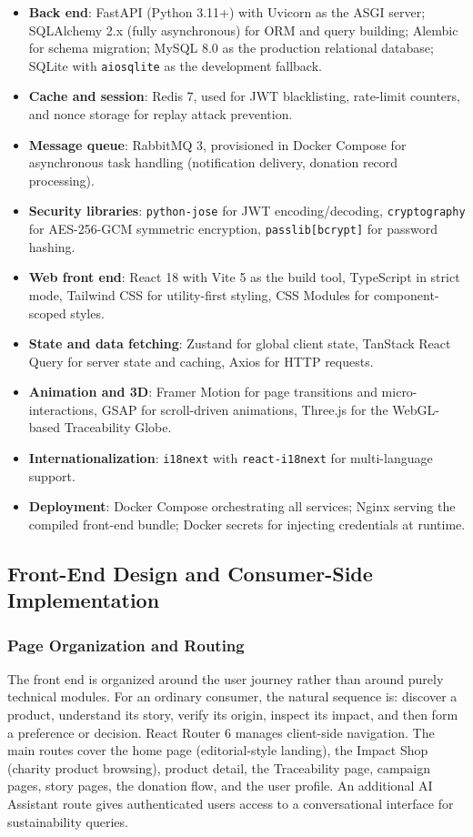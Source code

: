 \documentclass[11pt]{article}
\begin{document}
\begin{itemize}[leftmargin=2.2em]
    \item \textbf{Back end}: FastAPI (Python 3.11+) with Uvicorn as the ASGI server; SQLAlchemy 2.x (fully asynchronous) for ORM and query building; Alembic for schema migration; MySQL 8.0 as the production relational database; SQLite with \texttt{aiosqlite} as the development fallback.
    \item \textbf{Cache and session}: Redis 7, used for JWT blacklisting, rate-limit counters, and nonce storage for replay attack prevention.
    \item \textbf{Message queue}: RabbitMQ 3, provisioned in Docker Compose for asynchronous task handling (notification delivery, donation record processing).
    \item \textbf{Security libraries}: \texttt{python-jose} for JWT encoding/decoding, \texttt{cryptography} for AES-256-GCM symmetric encryption, \texttt{passlib[bcrypt]} for password hashing.
    \item \textbf{Web front end}: React 18 with Vite 5 as the build tool, TypeScript in strict mode, Tailwind CSS for utility-first styling, CSS Modules for component-scoped styles.
    \item \textbf{State and data fetching}: Zustand for global client state, TanStack React Query for server state and caching, Axios for HTTP requests.
    \item \textbf{Animation and 3D}: Framer Motion for page transitions and micro-interactions, GSAP for scroll-driven animations, Three.js for the WebGL-based Traceability Globe.
    \item \textbf{Internationalization}: \texttt{i18next} with \texttt{react-i18next} for multi-language support.
    \item \textbf{Deployment}: Docker Compose orchestrating all services; Nginx serving the compiled front-end bundle; Docker secrets for injecting credentials at runtime.
\end{itemize}

\subsection{Front-End Design and Consumer-Side Implementation}
\subsubsection{Page Organization and Routing}
The front end is organized around the user journey rather than around purely technical modules. For an ordinary consumer, the natural sequence is: discover a product, understand its story, verify its origin, inspect its impact, and then form a preference or decision. React Router 6 manages client-side navigation. The main routes cover the home page (editorial-style landing), the Impact Shop (charity product browsing), product detail, the Traceability page, campaign pages, story pages, the donation flow, and the user profile. An additional AI Assistant route gives authenticated users access to a conversational interface for sustainability queries.
\end{document}
